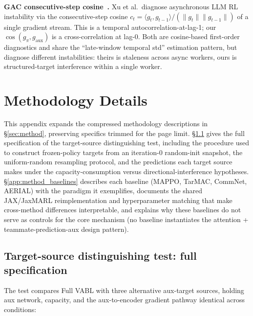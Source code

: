 \documentclass{article}
\theoremstyle{plain}
\theoremstyle{definition}
\theoremstyle{remark}
\begin{document}
\textbf{GAC consecutive-step cosine~\cite{xu2026gac}.} Xu et al.\
diagnose asynchronous LLM RL instability via the consecutive-step
cosine $c_t = \langle g_t, g_{t-1} \rangle / (\|g_t\|\|g_{t-1}\|)$
of a single gradient stream. This is a temporal
autocorrelation-at-lag-1; our $\cos(g_\pi, g_{\mathrm{aux}})$ is a
cross-correlation at lag-0. Both are cosine-based first-order
diagnostics and share the ``late-window temporal std'' estimation
pattern, but diagnose different instabilities: theirs is staleness
across async workers, ours is structured-target interference within
a single worker.


\section{Methodology Details}
\label{app:method_details}

This appendix expands the compressed methodology descriptions in
\S\ref{sec:method}, preserving specifics trimmed for the page
limit.
\S\ref{app:method_targets} gives the full specification of the
target-source distinguishing test, including the procedure used to
construct frozen-policy targets from an iteration-0 random-init
snapshot, the uniform-random resampling protocol, and the
predictions each target source makes under the capacity-consumption
versus directional-interference hypotheses.
\S\ref{app:method_baselines} describes each baseline
(MAPPO, TarMAC, CommNet, AERIAL) with the paradigm it exemplifies,
documents the shared JAX/JaxMARL reimplementation and
hyperparameter matching that make cross-method differences
interpretable, and explains why these baselines do not serve as
controls for the core mechanism (no baseline instantiates the
attention + teammate-prediction-aux design pattern).

\subsection{Target-source distinguishing test: full specification}
\label{app:method_targets}

The test compares Full VABL with three alternative aux-target
sources, holding aux network, capacity, and the aux-to-encoder
gradient pathway identical across conditions:
\end{document}
